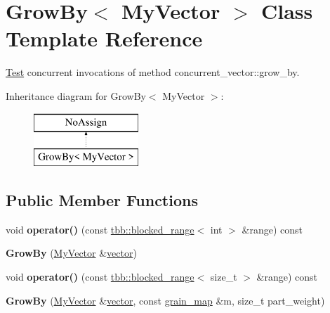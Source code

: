 \hypertarget{classGrowBy}{}\section{Grow\+By$<$ My\+Vector $>$ Class Template Reference}
\label{classGrowBy}


\hyperlink{classTest}{Test} concurrent invocations of method concurrent\+\_\+vector\+::grow\+\_\+by.  


Inheritance diagram for Grow\+By$<$ My\+Vector $>$\+:\begin{figure}[H]
\begin{center}
\leavevmode
\includegraphics[height=2.000000cm]{classGrowBy}
\end{center}
\end{figure}
\subsection*{Public Member Functions}
\begin{DoxyCompactItemize}
\item 
\hypertarget{classGrowBy_a1e0963b2eca923a4f7a485a6690c8965}{}void {\bfseries operator()} (const \hyperlink{classtbb_1_1blocked__range}{tbb\+::blocked\+\_\+range}$<$ int $>$ \&range) const \label{classGrowBy_a1e0963b2eca923a4f7a485a6690c8965}

\item 
\hypertarget{classGrowBy_a2e5fe00f754b9f8d538a237cab222a49}{}{\bfseries Grow\+By} (\hyperlink{classtbb_1_1concurrent__vector}{My\+Vector} \&\hyperlink{structvector}{vector})\label{classGrowBy_a2e5fe00f754b9f8d538a237cab222a49}

\item 
\hypertarget{classGrowBy_aa7152dd6e6d3194726dad6ea5892c427}{}void {\bfseries operator()} (const \hyperlink{classtbb_1_1blocked__range}{tbb\+::blocked\+\_\+range}$<$ size\+\_\+t $>$ \&range) const \label{classGrowBy_aa7152dd6e6d3194726dad6ea5892c427}

\item 
\hypertarget{classGrowBy_a64e3c0fe5f3336f200680d19d8be8942}{}{\bfseries Grow\+By} (\hyperlink{classtbb_1_1concurrent__vector}{My\+Vector} \&\hyperlink{structvector}{vector}, const \hyperlink{structgrain__map}{grain\+\_\+map} \&m, size\+\_\+t part\+\_\+weight)\label{classGrowBy_a64e3c0fe5f3336f200680d19d8be8942}

\end{DoxyCompactItemize}


